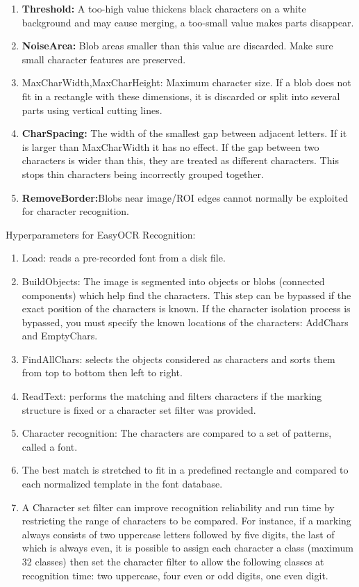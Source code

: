 \begin{enumerate}
	\item \textbf{Threshold:} A too-high value thickens black characters on a white background and may cause merging, a too-small value makes parts disappear. 
	\item \textbf{NoiseArea:} Blob areas smaller than this value are discarded. Make sure small character features are preserved.
	\item MaxCharWidth,MaxCharHeight: Maximum character size. If a blob does not fit in a rectangle with these dimensions, it is discarded or split into several parts using vertical cutting lines.
	\item \textbf{CharSpacing:} The width of the smallest gap between adjacent letters. If it is larger than MaxCharWidth it has no effect. If the gap between two characters is wider than this, they are treated as different characters. This stops thin characters being incorrectly grouped together.
	\item \textbf{RemoveBorder:}Blobs near image/ROI edges cannot normally be exploited for character recognition.
\end{enumerate}
Hyperparameters for EasyOCR Recognition: \cite{OpeneVision:2018}
\begin{enumerate}
	\item Load: reads a pre-recorded font from a disk file.
	\item BuildObjects: The image is segmented into objects or blobs (connected components) which help find the characters. This step can be bypassed if the exact position of the characters is known. If the character isolation process is bypassed, you must specify the known locations of the characters: AddChars and EmptyChars.
	\item FindAllChars: selects the objects considered as characters and sorts them from top to bottom then left to right.
	\item ReadText: performs the matching and filters characters if the marking structure is fixed or a character set filter was provided.
	\item Character recognition: The characters are compared to a set of patterns, called a font.
	\item The best match is stretched to fit in a predefined rectangle and compared to each normalized template in the font database.
	\item A Character set filter can improve recognition reliability and run time by restricting the range of characters to be compared. For instance, if a marking always consists of two uppercase letters followed by five digits, the last of which is always even, it is possible to assign each character a class (maximum 32 classes) then set the character filter to allow the following classes at recognition time: two uppercase, four even or odd digits, one even digit.
\end{enumerate}

